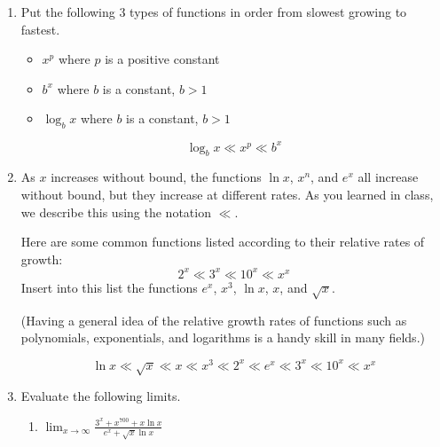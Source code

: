 \documentclass{article}
\begin{document}
\begin{enumerate}
\begin{enumerate}
\end{enumerate}

\probonly{\newpage}

\begin{framed}
    Suppose $f(x)$ and $g(x)$ are functions that are both positive when
    $x$ is large.  We say that $g(x)$ \uline{grows more quickly than}
    $f(x)$, written $g(x) \gg f(x)$, if $\displaystyle \lim_{x \to
      \infty} \frac{f(x)}{g(x)} = \cfitb{0.25in}{0}$ (or, equivalently,
    if $\displaystyle \lim_{x \to \infty} \frac{g(x)}{f(x)} =
    \cfitb{0.25in}{\infty}$).
  \end{framed}

\item Put the following 3 types of functions in order from slowest growing to fastest.
\begin{itemize}
    \item $x^p$ where $p$ is a positive constant
    \item $b^x$ where $b$ is a constant, $b>1$
    \item $\log_b x$ where $b$ is a constant, $b>1$
\end{itemize}
\begin{solution}
    \[\log_b x \ll x^p \ll b^x\]
\end{solution}
\probonly{\vfill}


\item As $x$ increases without bound, the functions
    $\ln x$, $x^n$, and $e^x$ all increase without bound, but they
    increase at different rates.  As you learned in class, we describe
    this using the notation $\ll$.

    Here are some common functions listed according to their relative
    rates of growth:
    \[ 2^x \ll 3^x \ll 10^x \ll x^x \] Insert into this list the functions
    $e^x$, $x^3$, $\ln x$, $x$, and $\sqrt{x}$.

    (Having a general idea of the relative growth rates of functions such
    as polynomials, exponentials, and logarithms is a handy skill in many
    fields.)  
    
    
    \begin{solution}
    \[\ln x \ll \sqrt{x} \ll x \ll x^3 \ll 2^x \ll e^x \ll 3^x \ll 10^x \ll
    x^x\] 
  \end{solution}
  \probonly{\vfill}

  \item Evaluate the following limits.

   \begin{enumerate}
        \item $\displaystyle{\lim_{x\to \infty} \frac{3^x + x^{700} + x\ln x}{e^x + \sqrt{x}\ln x}}$
        

\end{enumerate}
\end{enumerate}
\end{document}

